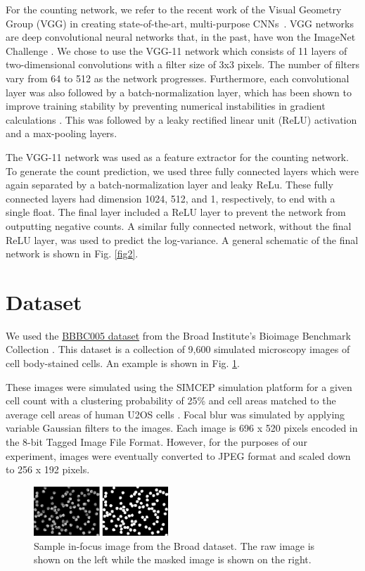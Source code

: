 \documentclass[10pt,twocolumn,letterpaper]{article}
\begin{document}
For the counting network, we refer to the recent work of the Visual Geometry Group (VGG) in creating state-of-the-art, multi-purpose CNNs~\cite{vgg}. VGG networks are deep convolutional neural networks that, in the past, have won the ImageNet Challenge \cite{vgg}.
We chose to use the VGG-11 network which consists of 11 layers of two-dimensional convolutions with a filter size of 3x3 pixels.
The number of filters vary from 64 to 512 as the network progresses. Furthermore, each convolutional layer was also followed by a batch-normalization layer, which has been shown to improve training stability by preventing numerical instabilities in gradient calculations \cite{batchnorm}. This was followed by a leaky rectified linear unit (ReLU) activation and a max-pooling layers.

The VGG-11 network was used as a feature extractor for the counting network. To generate the count prediction, we used three fully connected layers which were again separated by a batch-normalization layer and leaky ReLu. These fully connected layers had dimension 1024, 512, and 1, respectively, to end with a single float. The final layer included a ReLU layer to prevent the network from outputting negative counts. A similar fully connected network, without the final ReLU layer, was used to predict the log-variance.
A general schematic of the final network is shown in Fig. \ref{fig2}.


\section{Dataset}
\label{sec:data}
We used the \href{https://data.broadinstitute.org/bbbc/BBBC005/}{BBBC005 dataset} from the Broad Institute's Bioimage Benchmark Collection \cite{bbbc}. This dataset is a collection of 9,600 simulated microscopy images of cell body-stained cells. An example is shown in Fig. \ref{fig_broad}.

These images were simulated using the SIMCEP simulation platform for a given cell count with a clustering probability of 25\% and cell areas matched to the average cell areas of human U2OS cells \cite{simcep1, simcep2}.
Focal blur was simulated by applying variable Gaussian filters to the images. Each image is 696 x 520 pixels encoded in the 8-bit Tagged Image File Format.
However, for the purposes of our experiment, images were eventually converted to JPEG format and scaled down to 256 x 192 pixels.

\begin{figure}[!t]
\centering
\includegraphics[width=0.45\textwidth]{Picture1}
\caption{Sample in-focus image from the Broad dataset. The raw image is shown on the left while the masked image is shown on the right.}
\label{fig_broad}
\end{figure}
\end{document}
